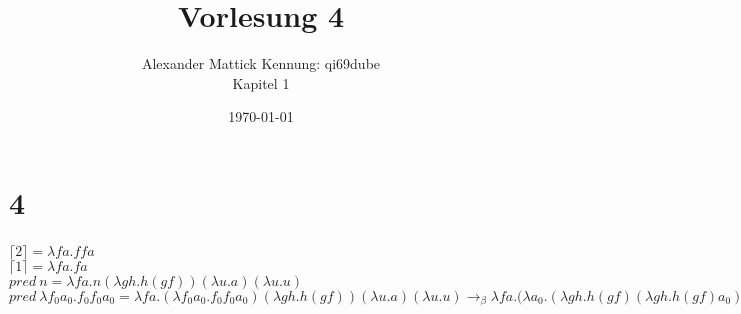\documentclass{article}
\author{
Alexander Mattick Kennung: qi69dube\\
Kapitel 1
}
\date{\today}
\title{Vorlesung 4}
\begin{document}
	\maketitle
	\section{4}
	\subsubsection{}
	$\lceil 2\rceil = \lambda fa. ffa$\\
	$\lceil 1\rceil = \lambda fa. fa$\\
	$pred\ n= \lambda fa.n(\lambda gh.h(gf))(\lambda u.a)(\lambda u.u)$\\
	$pred\ \lambda f_0a_0. f_0f_0a_0= \lambda fa.(\lambda f_0 a_0. f_0f_0a_0)(\lambda gh.h(gf))(\lambda u.a)(\lambda u.u) \to_\beta \lambda fa.(\lambda a_0. (\lambda gh.h(gf)(\lambda gh.h(gf)a_0))(\lambda u.a)(\lambda u.u) \to_\beta \lambda fa.((\lambda gh.h(gf)(\lambda gh.h(gf)(\lambda u.a)))(\lambda u.u)\to_\beta
	\lambda fa.((\lambda h_0.h_0((\lambda gh.h(gf)f))(\lambda u.a))) (\lambda u.u)\to_\beta
	\lambda fa.((\lambda h_0.h_0((\lambda h.h((\lambda u.a)ff))))) (\lambda u.u)\to_\beta
	\lambda fa.(\lambda h_0.h_0\lambda h.h((\lambda u.a)ff)) (\lambda u.u)\to_\beta
	\lambda fa.(f\lambda h.h((\lambda u.a)f)) (\lambda u.u)\to_\beta
	\lambda fa.f\lambda h.h(\lambda u.a)f (\lambda u.u)\to_\beta
	\lambda fa.f\lambda h.ha (\lambda u.u)\to_\beta
	\lambda fa.f(\lambda u.u)a \to_\beta
	\lambda fa.fa \to_\delta \lceil 1\rceil$\\
\end{document}
